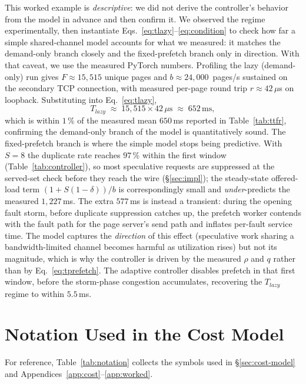 \documentclass[journal]{IEEEtran}
\begin{document}
This worked example is \emph{descriptive}: we did not derive the controller's
behavior from the model in advance and then confirm it. We observed the
regime experimentally, then instantiate
Eqs.~\eqref{eq:tlazy}--\eqref{eq:condition} to check how far a simple
shared-channel model accounts for what we measured: it matches the
demand-only branch closely and the fixed-prefetch branch only in direction.
With that caveat, we use the measured PyTorch numbers. Profiling the lazy (demand-only) run gives $F\!\approx\!15{,}515$
unique pages and $b\!\approx\!24{,}000$~pages/s sustained on the secondary
TCP connection, with measured per-page round trip $r\!\approx\!42\,\mu$s
on loopback. Substituting into Eq.~\eqref{eq:tlazy},
\begin{equation}
  T_\textit{lazy} \;\approx\; 15{,}515 \times 42\,\mu\text{s} \;\approx\; 652\,\text{ms},
  \label{eq:tlazy-num}
\end{equation}
which is within $1\,\%$ of the measured mean $650$\,ms reported in
Table~\ref{tab:ttfr}, confirming the demand-only branch of the model is
quantitatively sound. The fixed-prefetch branch is where the simple model
stops being predictive. With $S\!=\!8$ the duplicate rate reaches $97\,\%$
within the first window (Table~\ref{tab:controller}), so most speculative
requests are suppressed at the served-set check before they reach the wire
(\S\ref{sec:impl}); the steady-state offered-load term
$(1\!+\!S(1{-}\delta))/b$ is correspondingly small and \emph{under}-predicts
the measured $1{,}227$\,ms. The extra $577$\,ms is instead a transient:
during the opening fault storm, before duplicate suppression catches up, the
prefetch worker contends with the fault path for the page server's send path
and inflates per-fault service time. The model captures the \emph{direction}
of this effect (speculative work sharing a bandwidth-limited channel becomes
harmful as utilization rises) but not its magnitude, which is why the
controller is driven by the measured $\rho$ and $q$ rather than by
Eq.~\eqref{eq:tprefetch}. The adaptive controller disables prefetch in that
first window, before the storm-phase congestion accumulates, recovering the
$T_\textit{lazy}$ regime to within $5.5$\,ms.

\section{Notation Used in the Cost Model}
\label{app:notation}

For reference, Table~\ref{tab:notation} collects the symbols used in
\S\ref{sec:cost-model} and Appendices~\ref{app:cost}--\ref{app:worked}.
\end{document}
